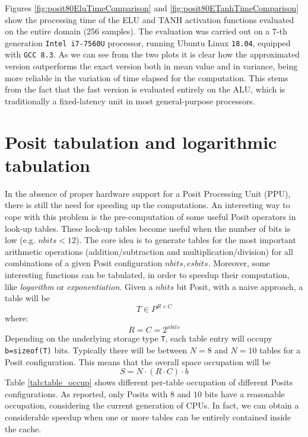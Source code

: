 Figures \ref{fig:posit80EluTimeComparison} and \ref{fig:posit80ETanhTimeComparison} show the processing time of the ELU and TANH activation functions evaluated on the entire  domain (256 samples). The evaluation was carried out on a 7-th generation \texttt{Intel i7-7560U} processor, running Ubuntu Linux \texttt{18.04}, equipped with \texttt{GCC 8.3}. As we can see from the two plots it is clear how the approximated version outperforms the exact version both in mean value and in variance, being more reliable in the variation of time elapsed for the computation. This stems from the fact that the fast version is evaluated entirely on the ALU, which is traditionally a fixed-latency unit in most general-purpose processors.

\section{Posit tabulation and logarithmic tabulation}

In the absence of proper hardware support for a Posit Processing Unit (PPU), there is still  the need for speeding up the computations. An interesting way to cope with this problem is the pre-computation of some useful Posit operators in look-up tables. These look-up tables become useful when the number of bits is low (e.g. $nbits < 12$).
The core idea is to generate tables for the most important arithmetic operations (addition/subtraction and multiplication/division) for all combinations of a given Posit configuration $nbits,esbits$.
Moreover, some interesting functions can be tabulated, in order to speedup their computation, like \textit{logarithm} or \textit{exponentiation}.
Given a $nbits$ bit Posit, with a naive approach, a table will be \[ T \in P^{R \times C} \] where: \[ R=C=2^{nbits}   \]
Depending on the underlying storage type \texttt{T}, each table entry will occupy \texttt{b=sizeof(T)} bits. Typically there will be between $N=8$ and $N=10$ tables for a Posit configuration. This means that the overall space occupation will be \[ S=N \cdot (R \cdot C) \cdot b \]
Table \ref{tab:table_occup} shows different per-table occupation of different Posits configurations. As reported, only Posits with $8$ and $10$ bits have a reasonable occupation, considering the current generation of CPUs. In fact, we can obtain a considerable speedup when one or more tables can be entirely contained inside the cache.

